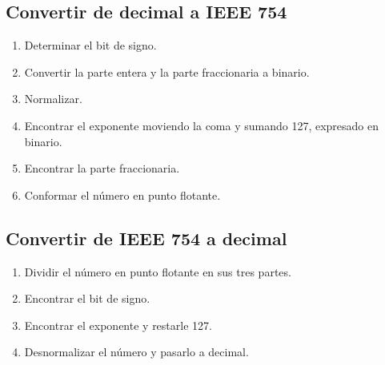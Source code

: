 \subsection{Convertir de decimal a IEEE 754}
\begin{enumerate}
    \item Determinar el bit de signo.
    \item Convertir la parte entera y la parte fraccionaria a binario.
    \item Normalizar.
    \item Encontrar el exponente moviendo la coma y sumando 127, expresado en binario.
    \item Encontrar la parte fraccionaria.
    \item Conformar el número en punto flotante.
\end{enumerate}

\subsection{Convertir de IEEE 754 a decimal}
\begin{enumerate}
    \item Dividir el número en punto flotante en sus tres partes.
    \item Encontrar el bit de signo.
    \item Encontrar el exponente y restarle 127.
    \item Desnormalizar el número y pasarlo a decimal.
\end{enumerate}

